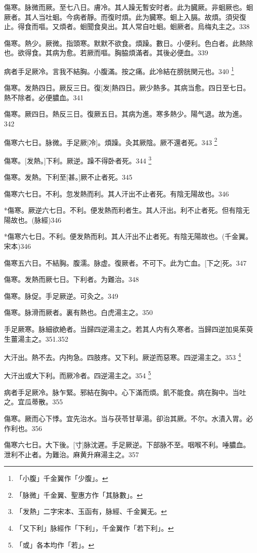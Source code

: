 \documentclass[12pt,oneside,UTF8,b5paper]{ctexbook}她她她她她她她
\begin{document}
傷寒。脉微而厥。至七八日。膚冷。其人躁无暫安时者。此为臓厥。非蛔厥也。蛔厥者。其人当吐蛔。今病者靜。而復时煩。此为臓寒。蛔上入膈。故煩。須臾復止。得食而嘔。又煩者。蛔聞食臭出。其人常自吐蛔。蛔厥者。烏梅丸主之。338

傷寒。熱少。厥微。指頭寒。默默不欲食。煩躁。數日。小便利。色白者。此熱除也。欲得食。其病为愈。若厥而嘔。胸脇煩滿者。其後必便血。339

病者手足厥冷。言我不結胸。小腹滿。按之痛。此冷結在膀胱関元也。340
	\footnote{「小腹」千金翼作「少腹」。}

傷寒。发熱四日。厥反三日。復[发]熱四日。厥少熱多。其病当愈。四日至七日。熱不除者。必便膿血。341

傷寒。厥四日。熱反三日。復厥五日。其病为進。寒多熱少。陽气退。故为進。342

傷寒六七日。脉微。手足厥[冷]。煩躁。灸其厥陰。厥不還者死。343
	\footnote{「脉微」千金翼、聖惠方作「其脉數」。}

傷寒。[发熱。]下利。厥逆。躁不得卧者死。344
	\footnote{「发熱」二字宋本、玉函有，脉經、千金翼无。}

傷寒。发熱。下利至[甚。]厥不止者死。345

傷寒六七日。不利。忽发熱而利。其人汗出不止者死。有陰无陽故也。346

*傷寒。厥逆六七日。不利。便发熱而利者生。其人汗出。利不止者死。但有陰无陽故也。(脉經)346

*傷寒六七日。不利。便发熱而利。其人汗出不止者死。有陰无陽故也。(千金翼。宋本)346

傷寒五六日。不結胸。腹濡。脉虚。復厥者。不可下。此为亡血。[下之]死。347

傷寒。发熱而厥七日。下利者。为難治。348

傷寒。脉促。手足厥逆。可灸之。349

傷寒。脉滑而厥者。裏有熱也。白虎湯主之。350

手足厥寒。脉細欲絶者。当歸四逆湯主之。若其人内有久寒者。当歸四逆加吳茱萸生薑湯主之。351.352

大汗出。熱不去。内拘急。四肢疼。又下利。厥逆而惡寒。四逆湯主之。353
	\footnote{「又下利」脉經作「下利」，千金翼作「若下利」。}

大汗出或大下利。而厥冷者。四逆湯主之。354
	\footnote{「或」各本均作「若」。}

病者手足厥冷。脉乍緊。邪結在胸中。心下滿而煩。飢不能食。病在胸中。当吐之。宜瓜蒂散。355

傷寒。厥而心下悸。宜先治水。当与茯苓甘草湯。卻治其厥。不尔。水漬入胃。必作利也。356

傷寒六七日。大下後。[寸]脉沈遲。手足厥逆。下部脉不至。咽喉不利。唾膿血。泄利不止者。为難治。麻黄升麻湯主之。357
\end{document}

